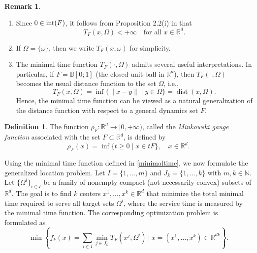 \documentclass[sn-mathphys-num]{sn-jnl}%
\theoremstyle{definition}
\newtheorem{definition}[theorem]{Definition}
\newtheorem{remark}[theorem]{Remark}
\begin{document}
\begin{remark}
	\label{T_remark}
	
	\begin{enumerate}
		\item [(a)] Since $0\in {\rm int}(F)$, it follows from Proposition 2.2(i) in \cite{durea2016minimal} that $$T_F(x,\Omega)<+\infty\quad\text{for all }x\in \mathbb{R}^d.$$
		\item [(b)] If $\Omega=\{\omega\}$, then we write $T_F(x,\omega)$ for simplicity.
		\item [(c)] The minimal time function $T_F(\cdot,\Omega)$ admits several useful interpretations. 
		In particular, if $F=\mathbb{B}[0;1]$ (the closed unit ball in $\mathbb{R}^d$), then 
		$T_F(\cdot,\Omega)$ becomes the usual distance function to the set $\Omega$, i.e.,
		\[
		T_F(x,\Omega)=\inf\{\|x-y\| \mid y\in\Omega\}= \operatorname{dist}(x,\Omega).
		\]
		Hence, the minimal time function can be viewed as a natural generalization of the distance function with respect to a general dynamics set $F$.
	\end{enumerate}
\end{remark}


\begin{definition}
	\label{rho_definition}
	The function \( \rho_F : \mathbb{R}^d \to [0, +\infty) \), called the \emph{Minkowski gauge function} associated with the set \( F \subset \mathbb{R}^d \), is defined by
	\begin{equation}\label{gauge}
		\rho_F(x) = \inf \{ t \geq 0 \mid x \in tF \}, \quad x \in \mathbb{R}^d.
	\end{equation}
\end{definition}


Using the minimal time function defined in \eqref{minimaltime}, we now formulate the generalized location problem.
Let $I = \{1, \dots, m\}$ and $J_k= \{1, \dots, k\}$ with $m,k \in \mathbb{N}$. Let $\{\Omega^i\}_{i\in I}$ be a family of nonempty compact (not necessarily convex) subsets of $ \mathbb{R}^d$.  The goal is to find $k$ centers $x^1,\dots,x^k \in \mathbb{R}^d$ that minimize the total minimal time required to serve all target sets $\Omega^i$, where the service time is measured by the minimal time function. 
The corresponding optimization problem is formulated as
\begin{equation} 
	\label{Generalized_Multi_Source_Weber_Problem}
	\min \left\{ f_k(x) = \sum_{i\in I} \min_{j\in J_k} T_F(x^j,\Omega^i) \ \bigg| \ x=(x^1,\dots,x^k)\in\mathbb{R}^{dk} \right\}.
\end{equation}
\end{document}
